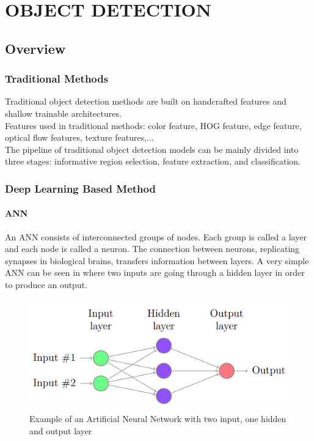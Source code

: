 \chapter{OBJECT DETECTION}

\renewcommand{\headrulewidth}{0.5pt}
\renewcommand{\footrulewidth}{0.5pt}
\thispagestyle{plain}
\pagestyle{fancy}
\fancyhf{}
\raggedright
{}

\section{Overview}

    \subsection{Traditional Methods}
        Traditional object detection methods are built on handcrafted features and shallow trainable architectures. \\
        \vspace{3mm}
        Features used in traditional methods: color feature, HOG feature, edge feature, optical flow features, texture features,... \\
        \vspace{3mm}
        The pipeline of traditional object detection models can be mainly divided into three stages: informative region selection, feature extraction, and classification.
    
    \subsection{Deep Learning Based Method}

        \subsubsection{ANN}
            An ANN consists of interconnected groups of nodes. Each group is called a layer and
            each node is called a neuron. The connection between neurons, replicating synapses
            in biological brains, transfers information between layers. A very simple ANN can be
            seen in where two inputs are going through a hidden layer in order to produce an output.    
            \begin{figure}[H]
                \centering
                \includegraphics[width=0.6\linewidth]{img/ANN.png}
                \caption{Example of an Artificial Neural Network with two input, one hidden and output layer}
            \end{figure}
        
